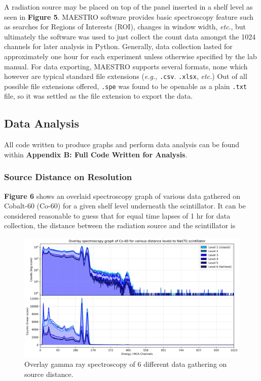 \documentclass[12pt]{article}
\begin{document}
\begin{multicols}{2}
A radiation source may be placed on top of the panel inserted in a 
shelf level as seen in \textbf{Figure 5}. MAESTRO software provides
basic spectroscopy feature such as searches for Regions of Interests (ROI),
changes in window width, \textit{etc}., but ultimately the software was used
to just collect the count data amongst the 1024 channels for later analysis in
Python. Generally, data collection lasted for approximately one hour for each
experiment unless otherwise specified by the lab manual. For data exporting,
MAESTRO supports several formats, none which however are typical standard
file extensions (\textit{e.g.}, \texttt{.csv}. \texttt{.xlsx}, \textit{etc.})
Out of all possible file extensions offered, \texttt{.spe} was found to be
openable as a plain \texttt{.txt} file, so it was settled as the file extension
to export the data.

\subsection{Data Analysis}
All code written to produce graphs and perform data analysis can be found within
\textbf{Appendix B: Full Code Written for Analysis}.

\subsubsection{Source Distance on Resolution}
\textbf{Figure 6} shows an overlaid spectroscopy graph of various data gathered on
Cobalt-60 (Co-60) for a given shelf level underneath the scintillator.
It can be considered reasonable to guess that for equal time lapses of 1 hr
for data collection, the distance between the radiation source and the scintillator
is
\end{multicols}
\begin{figure}[H]
    \centering
    \includegraphics[width=0.98\linewidth]{figs/fig6.png}
    \caption{
        Overlay gamma ray spectroscopy of 6 different data gathering on source distance.
    }
\end{figure}
\end{document}
